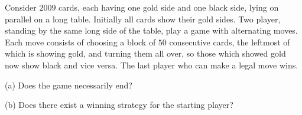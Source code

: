 Consider $2009$ cards, each having one gold side and one black side, lying on parallel on a long table. Initially all cards show their gold sides. Two player, standing by the same long side of the table, play a game with alternating moves. Each move consists of choosing a block of $50$ consecutive cards, the leftmost of which is showing gold, and turning them all over, so those which showed gold now show black and vice versa. The last player who can make a legal move wins.

(a) Does the game necessarily end?

(b) Does there exist a winning strategy for the starting player?